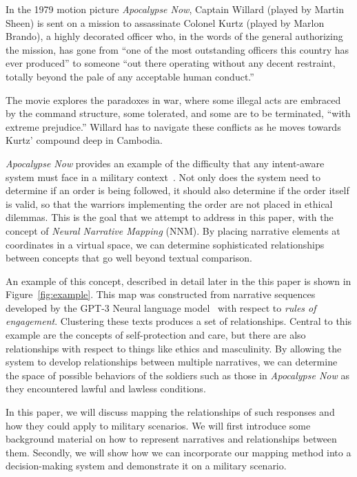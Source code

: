 \documentclass[11pt,dvipdfm]{article}
\begin{document}
In the 1979 motion picture \textit{Apocalypse Now}, Captain Willard (played by Martin Sheen) is sent on a mission to assassinate Colonel Kurtz (played by Marlon Brando), a highly decorated officer who, in the words of the general authorizing the mission, has gone from \enquote{one of the most outstanding officers this country has ever produced} to someone \enquote{out there operating without any decent restraint, totally beyond the pale of any acceptable human conduct.} 

The movie explores the paradoxes in war, where some illegal acts are embraced by the command structure, some tolerated, and some are to be terminated, \enquote{with extreme prejudice.} Willard has to navigate these conflicts as he moves towards Kurtz' compound deep in Cambodia.  

\textit{Apocalypse Now} provides an example of the difficulty that any intent-aware system must face in a military context~\cite{shattuck2000communication}. Not only does the system need to determine if an order is being followed, it should also determine if the order itself is valid, so that the warriors implementing the order are not placed in ethical dilemmas. This is the goal that we attempt to address in this paper, with the concept of \textit{Neural Narrative Mapping} (NNM). By placing narrative elements at coordinates in a virtual space, we can determine sophisticated relationships between concepts that go well beyond textual comparison.

An example of this concept, described in detail later in the this paper is shown in Figure~\ref{fig:example}. This map was constructed  from narrative sequences developed by the GPT-3 Neural language model~\cite{radford2018improving} with respect to \textit{rules of engagement}. Clustering these texts produces a set of relationships. Central to this example are the concepts of self-protection and care, but there are also relationships with respect to things like ethics and masculinity. By allowing the system to develop relationships between multiple narratives, we can determine the space of possible behaviors of the soldiers such as those in \textit{Apocalypse Now} as they encountered lawful and lawless conditions.

In this paper, we will discuss mapping the relationships of such responses and how they could apply to military scenarios.  We will first introduce some background material on how to represent narratives and relationships between them. Secondly, we will show how we can incorporate our mapping method into a decision-making system and demonstrate it on a military scenario.
\end{document}
